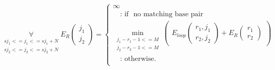 \begin{equation*}
\underset{\substack{sj_{1} <= j_{1} <= sj_{1}+N\\sj_{2} <= j_{2} <= sj_{2}+N}}{\forall}
E_R(\substack{j_1\\j_2}) = \begin{cases}
\infty\\
\quad\text{: if } \text{ no matching base pair }\\
\min\limits_{\substack{j_{1}-r_{1}-1 <= M\\j_{2}-r_{2}-1 <= M}}
\begin{pmatrix}
E_{loop}(\substack{r_1,j_1\\r_2,j_2}) + E_R(\substack{r_1\\r_2})
\end{pmatrix}\\
\quad\text{: otherwise.}\\

\end{cases}
\end{equation*}

